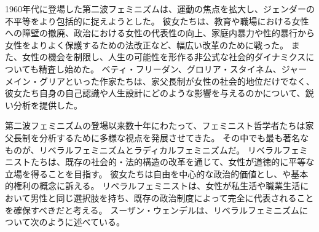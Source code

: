 \documentclass[paper=a4,book,openany]{jlreq}
\begin{document}
1960年代に登場した第二波フェミニズムは、運動の焦点を拡大し、ジェンダーの不平等をより包括的に捉えようとした。
彼女たちは、教育や職場における女性への障壁の撤廃、政治における女性の代表性の向上、家庭内暴力や性的暴行から女性をよりよく保護するための法改正など、幅広い改革のために戦った。
また、女性の機会を制限し、人生の可能性を形作る非公式な社会的ダイナミクスについても精査し始めた。
ベティ・フリーダン、グロリア・スタイネム、ジャーメイン・グリアといった作家たちは、家父長制が女性の社会的地位だけでなく、彼女たち自身の自己認識や人生設計にどのような影響を与えるのかについて、鋭い分析を提供した。

第二波フェミニズムの登場以来数十年にわたって、フェミニスト哲学者たちは家父長制を分析するために多様な視点を発展させてきた。
その中でも最も著名なものが、リベラルフェミニズムとラディカルフェミニズムだ。
リベラルフェミニストたちは、既存の社会的・法的構造の改革を通じて、女性が道徳的に平等な立場を得ることを目指す。
彼女たちは自由を中心的な政治的価値とし、や基本的権利の概念に訴える。
リベラルフェミニストは、女性が私生活や職業生活において男性と同じ選択肢を持ち、既存の政治制度によって完全に代表されることを確保すべきだと考える。
スーザン・ウェンデルは、リベラルフェミニズムについて次のように述べている。
\end{document}
